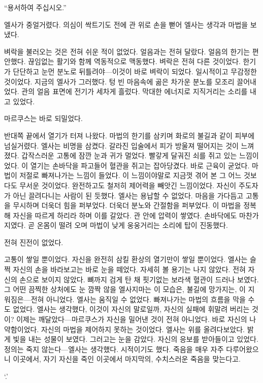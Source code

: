 ``용서하여 주십시오.''

엘사가 중얼거렸다. 의심이 싹트기도 전에 관 위로 손을 뻗어 엘사는 생각과 마법을 보냈다.

벼락을 불러오는 것은 전혀 쉬운 적이 없었다. 얼음과는 전혀 달랐다. 얼음의 한기는 편안했다. 끊임없는 활기와 함께 역동적으로 맥동했다. 벼락은 전혀 다른 것이었다. 한기가 단단하고 눈먼 분노로 뒤틀려야—이것이 바로 벼락이 되었다. 일시적이고 무감정한 것이었다. 지금의 엘사가 그러했다. 텅 빈 마음속에 곪은 차가운 분노를 모조리 끌어내었다. 관의 얼음 표면에 전기가 세차게 흘렀다. 막대한 에너지로 지직거리는 소리를 내고 있었다.

마르쿠스는 바로 되밀었다.

반대쪽 끝에서 열기가 터져 나왔다. 마법의 한기를 삼키며 화로의 불길과 같이 피부에 넘실거렸다. 엘사는 비명을 삼켰다. 갈라진 입술에서 피가 방울져 떨어지는 것이 느껴졌다. 갑작스러운 고통에 잠깐 눈과 귀가 멀었다. 빨갛게 달궈진 쇠를 쥐고 있는 느낌이었다. 이 열기는 손바닥을 파고들어 혈관을 쥐고는 잡아당겼다. 바로 근육이 굳었다. 마법이 저절로 빠져나가는 느낌이 들었다. 이 느낌이야말로 지금껏 겪어 본 그 어느 것보다도 무서운 것이었다. 완전하고도 철저히 제어력을 빼앗긴 느낌이었다. 자신이 주도자가 아닌 끌려다니는 사람이 된 듯했다. 엘사는 용납할 수 없었다. 마음을 가다듬고 고통을 무시하며 더욱더 힘을 퍼부었다. 더욱더 분노와 간절함을 퍼부었다. 이 마법을 정복해 자신을 따르게 하리라 하며 이를 갈았다. 관 안에 압력이 쌓였다. 손바닥에도 마찬가지였다. 곧 온몸이 떨려 오며 마법이 낮게 웅웅거리는 소리에 탑이 진동했다.

전혀 진전이 없었다.

고통이 쌓일 뿐이었다. 자신을 완전히 삼킬 환상의 열기만이 쌓일 뿐이었다. 엘사는 슬쩍 자신의 손을 바라보고는 바로 눈을 떼었다. 자세히 볼 용기는 나지 않았다. 전혀 자신의 손으로 보이지 않았다. 뼈까지 검게 탄 채 핏기없는 보라색 혈관이 드러나 보였다. 그 어떤 끔찍한 상처에도 눈 깜짝 않을 엘사지마는 이 모습은, 불길에 망가지는, 이 지워짐은—전혀 아니었다. 엘사는 움직일 수 없었다. 빠져나가는 마법의 흐름을 막을 수도 없었다. 엘사는 생각했다, 이것이 자신의 말로일까, 자신의 실패에 휘말려 버리는 것이? 이제는 깨달았다—마르쿠스가 자신을 밀어낸 것이 전혀 아니었다. 바로 자신의 나약함이었다. 자신의 마법을 제어하지 못하는 것이었다. 엘사는 위를 올려다보았다. 밝게 빛을 내는 성물이 보였다. 그러고는 눈을 감았다. 자신의 응보를 받아들이고 있었다. 정의는 죽지 않는다—엘사는 생각했다. 시적이기도 했다. 죽음을 매우 자주 다루어왔으니 이곳에서, 자기 자신을 죽인 이곳에서 마지막의, 수치스러운 죽음을 맞는다고.

`.'


